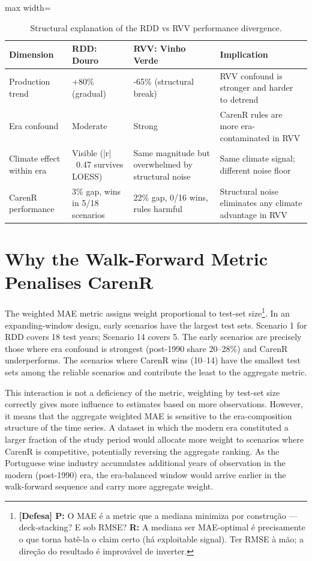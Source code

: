 \begin{table}[htbp]
  \centering
  \caption{Structural explanation of the RDD vs RVV performance divergence.}\label{tab:ch6a_1}
  \small
  \begin{adjustbox}{max width=\textwidth}
    \begin{tabularx}{\textwidth}{p{2.9cm}|p{2.7cm}|p{3.3cm}|X}
  \toprule
  Dimension & RDD: Douro & RVV: Vinho Verde & Implication \\
  \midrule
  Production trend & +80\% (gradual) & -65\% (structural break) & RVV confound is stronger and harder to detrend \\
  Era confound & Moderate & Strong & CarenR rules are more era-contaminated in RVV \\
  Climate effect within era & Visible (|r|~0.47 survives LOESS) & Same magnitude but overwhelmed by structural noise & Same climate signal; different noise floor \\
  CarenR performance & 3\% gap, wins in 5/18 scenarios & 22\% gap, 0/16 wins, rules harmful & Structural noise eliminates any climate advantage in RVV \\
  \bottomrule
\end{tabularx}
  \end{adjustbox}

\end{table}



\section{Why the Walk-Forward Metric Penalises CarenR}\label{sec:why_the_walkforward_metric}

The weighted MAE metric assigns weight proportional to test-set size\footnote{\textbf{[Defesa] P:} O MAE é a metric que a mediana minimiza por construção --- deck-stacking? E sob RMSE? \textbf{R:} A mediana ser MAE-optimal é precisamente o que torna batê-la o claim certo (há exploitable signal). Ter RMSE à mão; a direção do resultado é improvável de inverter.}. In an expanding-window design, early scenarios have the largest test sets. Scenario 1 for RDD covers 18 test years; Scenario 14 covers 5. The early scenarios are precisely those where era confound is strongest (post-1990 share 20--28\%) and CarenR underperforms. The scenarios where CarenR wins (10--14) have the smallest test sets among the reliable scenarios and contribute the least to the aggregate metric.

This interaction is not a deficiency of the metric, weighting by test-set size correctly gives more influence to estimates based on more observations. However, it means that the aggregate weighted MAE is sensitive to the era-composition structure of the time series. A dataset in which the modern era constituted a larger fraction of the study period would allocate more weight to scenarios where CarenR is competitive, potentially reversing the aggregate ranking. As the Portuguese wine industry accumulates additional years of observation in the modern (post-1990) era, the era-balanced window would arrive earlier in the walk-forward sequence and carry more aggregate weight.


